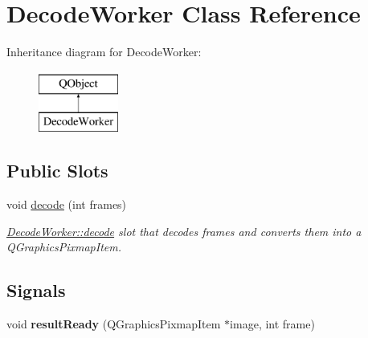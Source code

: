 \hypertarget{classDecodeWorker}{}\section{Decode\+Worker Class Reference}
\label{classDecodeWorker}
Inheritance diagram for Decode\+Worker\+:\begin{figure}[H]
\begin{center}
\leavevmode
\includegraphics[height=2.000000cm]{classDecodeWorker}
\end{center}
\end{figure}
\subsection*{Public Slots}
\begin{DoxyCompactItemize}
\item 
void \hyperlink{classDecodeWorker_a12b8b121cb1745f5a88e8f8df16eee87}{decode} (int frames)
\begin{DoxyCompactList}\small\item\em \hyperlink{classDecodeWorker_a12b8b121cb1745f5a88e8f8df16eee87}{Decode\+Worker\+::decode} slot that decodes frames and converts them into a Q\+Graphics\+Pixmap\+Item. \end{DoxyCompactList}\end{DoxyCompactItemize}
\subsection*{Signals}
\begin{DoxyCompactItemize}
\item 
void {\bfseries result\+Ready} (Q\+Graphics\+Pixmap\+Item $\ast$image, int frame)\hypertarget{classDecodeWorker_a1f70e9b7ed81691577e5db962653bcc2}{}\label{classDecodeWorker_a1f70e9b7ed81691577e5db962653bcc2}

\end{DoxyCompactItemize}
